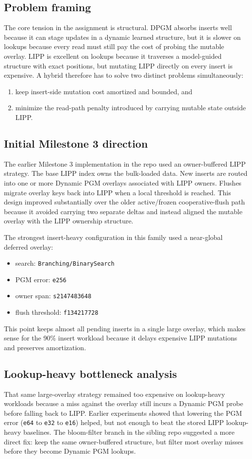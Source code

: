 \documentclass[11pt]{article}
\begin{document}
\subsection*{Problem framing}
The core tension in the assignment is structural. DPGM absorbs inserts well because it can stage updates in a dynamic learned structure, but it is slower on lookups because every read must still pay the cost of probing the mutable overlay. LIPP is excellent on lookups because it traverses a model-guided structure with exact positions, but mutating LIPP directly on every insert is expensive. A hybrid therefore has to solve two distinct problems simultaneously:
\begin{enumerate}
  \item keep insert-side mutation cost amortized and bounded, and
  \item minimize the read-path penalty introduced by carrying mutable state outside LIPP.
\end{enumerate}

\subsection*{Initial Milestone 3 direction}
The earlier Milestone 3 implementation in the repo used an owner-buffered LIPP strategy. The base LIPP index owns the bulk-loaded data. New inserts are routed into one or more Dynamic PGM overlays associated with LIPP owners. Flushes migrate overlay keys back into LIPP when a local threshold is reached. This design improved substantially over the older active/frozen cooperative-flush path because it avoided carrying two separate deltas and instead aligned the mutable overlay with the LIPP ownership structure.

The strongest insert-heavy configuration in this family used a near-global deferred overlay:
\begin{itemize}
  \item search: \texttt{Branching/BinarySearch}
  \item PGM error: \texttt{e256}
  \item owner span: \texttt{s2147483648}
  \item flush threshold: \texttt{f134217728}
\end{itemize}
This point keeps almost all pending inserts in a single large overlay, which makes sense for the 90\% insert workload because it delays expensive LIPP mutations and preserves amortization.

\subsection*{Lookup-heavy bottleneck analysis}
That same large-overlay strategy remained too expensive on lookup-heavy workloads because a miss against the overlay still incurs a Dynamic PGM probe before falling back to LIPP. Earlier experiments showed that lowering the PGM error (\texttt{e64} to \texttt{e32} to \texttt{e16}) helped, but not enough to beat the stored LIPP lookup-heavy baselines. The bloom-filter branch in the sibling repo suggested a more direct fix: keep the same owner-buffered structure, but filter most overlay misses before they become Dynamic PGM lookups.
\end{document}
